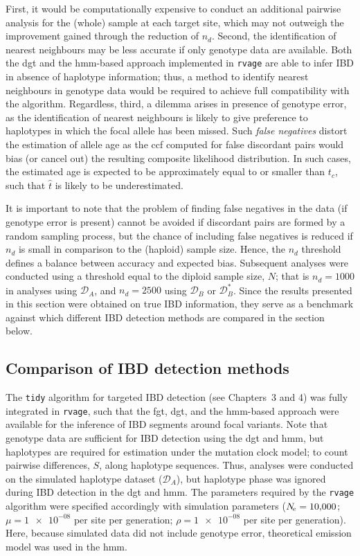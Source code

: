 First, it would be computationally expensive to conduct an additional pairwise analysis for the (whole) sample at each target site, which may not outweigh the improvement gained through the reduction of $n_d$.
Second, the identification of nearest neighbours may be less accurate if only genotype data are available.
Both the \gls{dgt} and the \gls{hmm}-based approach implemented in \texttt{rvage} are able to infer IBD in absence of haplotype information; thus, a method to identify nearest neighbours in genotype data would be required to achieve full compatibility with the algorithm.
Regardless, third, a dilemma arises in presence of genotype error, as the identification of nearest neighbours is likely to give preference to haplotypes in which the focal allele has been missed.
\label{p:falseneg}%
Such \emph{false negatives} distort the estimation of allele age as the \gls{ccf}
computed for false discordant pairs would bias (or cancel out) the resulting composite likelihood distribution.
In such cases, the estimated age is expected to be approximately equal to or smaller than $t_c$, such that $\hat{t}$ is likely to be underestimated.

It is important to note that the problem of finding false negatives in the data (if genotype error is present) cannot be avoided if discordant pairs are formed by a random sampling process, but the chance of including false negatives is reduced if $n_d$ is small in comparison to the (haploid) sample size.
Hence, the $n_d$ threshold defines a balance between accuracy and expected bias.
Subsequent analyses were conducted using a threshold equal to the diploid sample size, $N$; that is ${n_d = \num{1000}}$ in analyses using $\mathcal{D}_A$, and ${n_d = \num{2500}}$ using $\mathcal{D}_B$ or $\mathcal{D}_B^{\ast}$.
Since the results presented in this section were obtained on true IBD information, they serve as a benchmark against which different IBD detection methods are compared in the section below.


%
\subsection{Comparison of IBD detection methods}
%

The \texttt{tidy} algorithm for targeted IBD detection (see Chapters~3 and 4) was fully integrated in \texttt{rvage}, such that the \gls{fgt}, \gls{dgt}, and the \gls{hmm}-based approach were available for the inference of IBD segments around focal variants.
Note that genotype data are sufficient for IBD detection using the \gls{dgt} and \gls{hmm}, but haplotypes are required for estimation under the mutation clock model; \ie to count pairwise differences, $S$, along haplotype sequences.
Thus, analyses were conducted on the simulated haplotype dataset ($\mathcal{D}_A$), but haplotype phase was ignored during IBD detection in the \gls{dgt} and \gls{hmm}.
The parameters required by the \texttt{rvage} algorithm were specified accordingly with simulation parameters (${N_{\!e} = \num{10000}}$; ${\mu = \num{1e-08}}$ per site per generation; ${\rho = \num{1e-08}}$ per site per generation).
Here, because simulated data did not include genotype error, theoretical emission model was used in the \gls{hmm}.

